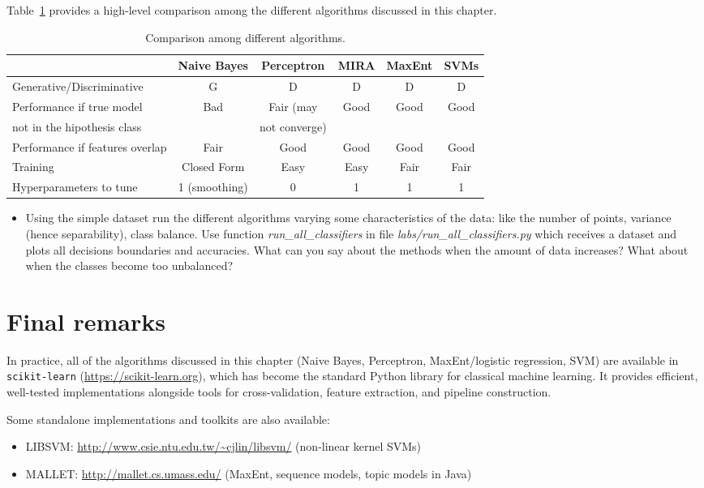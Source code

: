 Table~\ref{tab:comparison_lab1} provides a high-level comparison among the different algorithms discussed in this chapter. 
\begin{table}[h]
\centering
\small
\begin{tabular}{l|ccccc}
& Naive Bayes & Perceptron & MIRA & MaxEnt & SVMs\\
\hline
Generative/Discriminative 			& G & D & D & D & D\\
\hline
Performance if true model 	& Bad & Fair (may & Good & Good & Good\\
not in the hipothesis class	&  & not converge) &  &  & \\
\hline
Performance if features 
overlap									& Fair & Good & Good & Good & Good\\
\hline
Training									& Closed Form & Easy & Easy & Fair & Fair\\
\hline
Hyperparameters to tune				& 1 (smoothing) & 0 & 1 & 1 & 1\\
\hline\hline
\end{tabular}
\caption{Comparison among different algorithms.\label{tab:comparison_lab1}}
\end{table}

\begin{exercise}
\begin{itemize}
\item Using the simple dataset run the different algorithms varying some
  characteristics of the data: like the number of points, variance (hence
  separability), class balance. Use function
  \emph{run\_all\_classifiers} in file \emph{labs/run\_all\_classifiers.py} which receives a
  dataset and plots all decisions boundaries and accuracies. What can
  you say about the methods when the amount of data increases? What
  about when the classes become too unbalanced?
\end{itemize}
\end{exercise}


\section{Final remarks}

In practice, all of the algorithms discussed in this chapter (Naive Bayes, Perceptron, MaxEnt/logistic regression, SVM) are available in \texttt{scikit-learn} (\url{https://scikit-learn.org}), which has become the standard Python library for classical machine learning. It provides efficient, well-tested implementations alongside tools for cross-validation, feature extraction, and pipeline construction.

Some standalone implementations and toolkits are also available:
\begin{itemize}
\item LIBSVM: \url{http://www.csie.ntu.edu.tw/~cjlin/libsvm/} (non-linear kernel SVMs)
\item MALLET: \url{http://mallet.cs.umass.edu/} (MaxEnt, sequence models, topic models in Java)
\end{itemize}


